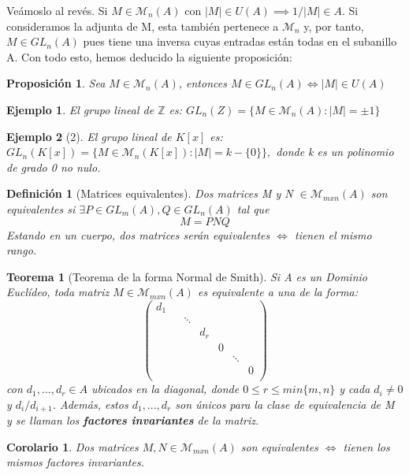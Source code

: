 \documentclass[11pt, a4paper, titlepage]{article}
\providecommand{\ent}{\mathbb{Z}}
\theoremstyle{theorem-style}
\newtheorem*{nth}{Teorema}
\newtheorem*{nprop}{Proposición}
\newtheorem{ncor}{Corolario}
\theoremstyle{definition-style}
\newtheorem*{ndef}{Definición}
\theoremstyle{remark-style}
\theoremstyle{example-style}
\newtheorem*{ejemplo}{Ejemplo}
\begin{document}
Veámoslo al revés. Si $M\in \mathcal{M}_n(A)$ con $|M| \in U(A) \implies 1/|M| \in A$. Si consideramos la adjunta de M, esta también pertenece a $\mathcal{M}_n$ y, por tanto, $M \in GL_n(A)$ pues tiene una inversa cuyas entradas están todas en el subanillo A.
Con todo esto, hemos deducido la siguiente proposición:

\begin{nprop}
	Sea $M \in \mathcal{M}_n(A)$, entonces $M \in GL_n(A) \iff |M| \in U(A)$
\end{nprop}

\begin{ejemplo}
	El grupo lineal de $\ent$ es: $GL_n(Z) = \{M \in \mathcal{M}_n(A) :  |M| = \pm 1\}$
\end{ejemplo}

\begin{ejemplo}[2]
	El grupo lineal de $K[x]$ es: $GL_n(K[x]) = \{M \in \mathcal{M}_n(K[x]) :  |M| = k - \{0\} \},$ donde k es un polinomio de grado 0 no nulo.
\end{ejemplo}

\begin{ndef}[Matrices equivalentes]
	Dos matrices M y N $\in \mathcal{M}_{mxn}(A)$ son equivalentes si $\exists P\in GL_m(A), Q \in GL_n(A)$ tal que
	\[
	M = PNQ
	\]
Estando en un cuerpo, dos matrices serán equivalentes $\iff$ tienen el mismo rango.
\end{ndef}

\begin{nth}[Teorema de la forma Normal de Smith]
	Si A es un Dominio Euclídeo, toda matriz  $M \in \mathcal{M}_{mxn}(A)$ es equivalente a una de la forma:
		\[ \begin{pmatrix}
			 d_{1}&  &  & & \\
			 &  & \ddots &  &  \\
			 & & &d_{r} &\\
			 & & & & 0 \\
			 & & & & & \ddots& \\
			 & & & &  & & 0 \\
		\end{pmatrix} \]
con $d_{1},...,d_{r} \in A$ ubicados en la diagonal, donde $ 0 \leq r \leq min\{m,n\} $ y cada $d_{i}\ne 0$ y $d_{i}/ d_{i+1}$.  Además, estos $d_{1}, ...,d_{r}$ son únicos para la clase de equivalencia de M y se llaman los \textbf{factores invariantes} de la matriz.
\end{nth}

\begin{ncor}
	Dos matrices $M,N \in \mathcal{M}_{mxn}(A)$ son equivalentes $\iff$ tienen los mismos factores invariantes.
\end{ncor}
\end{document}
